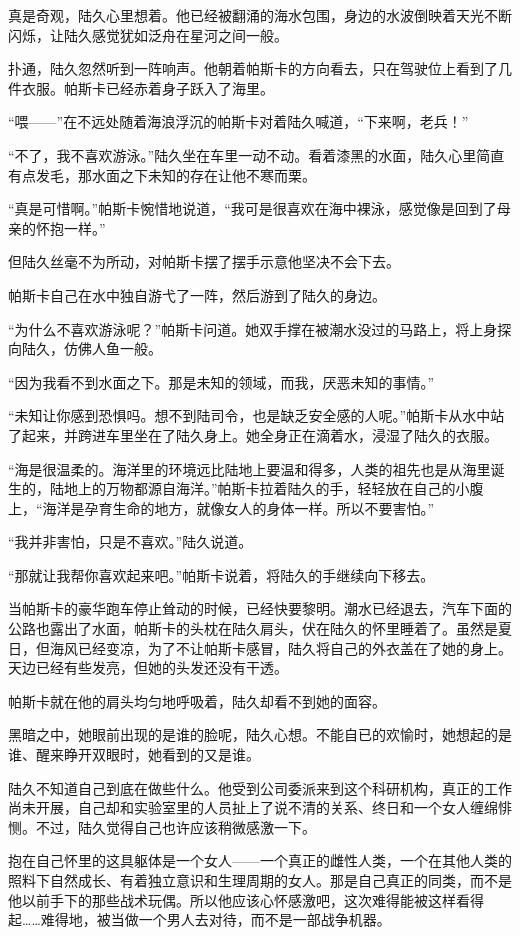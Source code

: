 真是奇观，陆久心里想着。他已经被翻涌的海水包围，身边的水波倒映着天光不断闪烁，让陆久感觉犹如泛舟在星河之间一般。

扑通，陆久忽然听到一阵响声。他朝着帕斯卡的方向看去，只在驾驶位上看到了几件衣服。帕斯卡已经赤着身子跃入了海里。

“喂——”在不远处随着海浪浮沉的帕斯卡对着陆久喊道，“下来啊，老兵！”

“不了，我不喜欢游泳。”陆久坐在车里一动不动。看着漆黑的水面，陆久心里简直有点发毛，那水面之下未知的存在让他不寒而栗。

“真是可惜啊。”帕斯卡惋惜地说道，“我可是很喜欢在海中裸泳，感觉像是回到了母亲的怀抱一样。”

但陆久丝毫不为所动，对帕斯卡摆了摆手示意他坚决不会下去。

帕斯卡自己在水中独自游弋了一阵，然后游到了陆久的身边。

“为什么不喜欢游泳呢？”帕斯卡问道。她双手撑在被潮水没过的马路上，将上身探向陆久，仿佛人鱼一般。

“因为我看不到水面之下。那是未知的领域，而我，厌恶未知的事情。”

“未知让你感到恐惧吗。想不到陆司令，也是缺乏安全感的人呢。”帕斯卡从水中站了起来，并跨进车里坐在了陆久身上。她全身正在滴着水，浸湿了陆久的衣服。

“海是很温柔的。海洋里的环境远比陆地上要温和得多，人类的祖先也是从海里诞生的，陆地上的万物都源自海洋。”帕斯卡拉着陆久的手，轻轻放在自己的小腹上，“海洋是孕育生命的地方，就像女人的身体一样。所以不要害怕。”

“我并非害怕，只是不喜欢。”陆久说道。

“那就让我帮你喜欢起来吧。”帕斯卡说着，将陆久的手继续向下移去。

当帕斯卡的豪华跑车停止耸动的时候，已经快要黎明。潮水已经退去，汽车下面的公路也露出了水面，帕斯卡的头枕在陆久肩头，伏在陆久的怀里睡着了。虽然是夏日，但海风已经变凉，为了不让帕斯卡感冒，陆久将自己的外衣盖在了她的身上。天边已经有些发亮，但她的头发还没有干透。

帕斯卡就在他的肩头均匀地呼吸着，陆久却看不到她的面容。

黑暗之中，她眼前出现的是谁的脸呢，陆久心想。不能自已的欢愉时，她想起的是谁、醒来睁开双眼时，她看到的又是谁。

陆久不知道自己到底在做些什么。他受到公司委派来到这个科研机构，真正的工作尚未开展，自己却和实验室里的人员扯上了说不清的关系、终日和一个女人缠绵悱恻。不过，陆久觉得自己也许应该稍微感激一下。

抱在自己怀里的这具躯体是一个女人——一个真正的雌性人类，一个在其他人类的照料下自然成长、有着独立意识和生理周期的女人。那是自己真正的同类，而不是他以前手下的那些战术玩偶。所以他应该心怀感激吧，这次难得能被这样看得起……难得地，被当做一个男人去对待，而不是一部战争机器。

